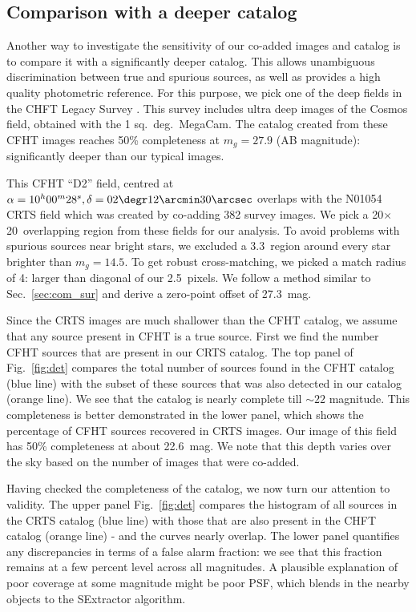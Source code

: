 \documentclass[fleqn,usenatbib]{mnras}
\newcommand{\sqd}{sq.~deg.}
\begin{document}
\subsection{Comparison with a deeper catalog}
Another way to investigate the sensitivity of our co-added images and catalog is to compare it with a significantly deeper catalog. This allows unambiguous discrimination between true and spurious sources, as well as provides a high quality photometric reference. For this purpose, we pick one of the deep fields in the CHFT Legacy Survey \citep{2012AJ....143...38G}. This survey includes ultra deep images of the Cosmos field, obtained with the 1 \sqd\ MegaCam. The catalog created from these CFHT images reaches 50\% completeness at $m_g = 27.9$ (AB magnitude): significantly deeper than our typical images.



This CFHT ``D2'' field, centred at $\alpha = 10^h 00^m 28^s, \delta = 02\degr 12\arcmin 30\arcsec$ overlaps with the N01054 CRTS field which was created by co-adding 382 survey images. We pick a 20\arcmin $\times$ 20\arcmin\ overlapping region from these fields for our analysis. To avoid problems with spurious sources near bright stars, we excluded a 3\arcmin.3\ region around every star brighter than $m_g = 14.5$. To get robust cross-matching, we picked a match radius of 4\arcsec: larger than diagonal of our 2\arcsec.5~pixels. We follow a method similar to Sec.~\ref{sec:com_sur} and derive a zero-point offset of 27.3~mag.

Since the CRTS images are much shallower than the CFHT catalog, we assume that any source present in CFHT is a true source. First we find the number CFHT sources that are present in our CRTS catalog. The top panel of Fig.~\ref{fig:det} compares the total number of sources found in the CFHT catalog (blue line) with the subset of these sources that was also detected in our catalog (orange line). We see that the catalog is nearly complete till $\sim 22$ magnitude. This completeness is better demonstrated in the lower panel, which shows the percentage of CFHT sources recovered in CRTS images. Our image of this field has 50\% completeness at about 22.6~mag. We note that this depth varies over the sky based on the number of images that were co-added.

Having checked the completeness of the catalog, we now turn our attention to validity.
The upper panel Fig.~\ref{fig:det} compares the histogram of all sources in the CRTS catalog (blue line) with those that are also present in the CHFT catalog (orange line) - and the curves nearly overlap. The lower panel quantifies any discrepancies in terms of a false alarm fraction:  we see that this fraction remains at a few percent level across all magnitudes.  A plausible explanation of poor coverage at some magnitude might be poor PSF, which blends in the nearby objects to the SExtractor algorithm.
\end{document}

